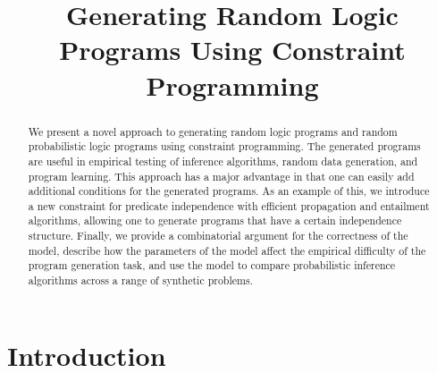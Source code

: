 \documentclass[runningheads]{llncs}
\begin{document}
\title{Generating Random Logic Programs Using Constraint Programming}

\maketitle

\begin{abstract}
  We present a novel approach to generating random logic programs and
  random probabilistic logic programs using constraint programming. The
  generated programs are useful in empirical testing of inference algorithms,
  random data generation, and program learning. This approach has a major
  advantage in that one can easily add additional conditions for the generated
  programs. As an example of this, we introduce a new constraint for predicate
  independence with efficient propagation and entailment algorithms, allowing
  one to generate programs that have a certain independence structure. Finally,
  we provide a combinatorial argument for the correctness of the model,
  describe how the parameters of the model affect the empirical difficulty of
  the program generation task, and use the model to compare probabilistic
  inference algorithms across a range of synthetic problems.

\end{abstract}


\section{Introduction}
\end{document}
